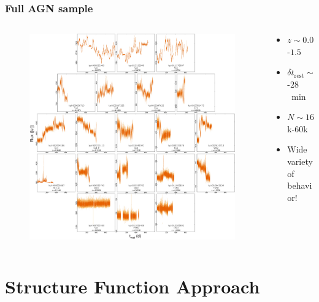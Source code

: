 \documentclass[hyperref={pdfpagelabels=false}]{beamer}
\begin{document}
\begin{frame}
\frametitle{Full AGN sample}
  \begin{columns}
    \centering
    \begin{column}{0.65\textwidth}
      \begin{figure}
        \includegraphics[scale=0.45]{images/AllLC.jpg}
      \end{figure}
    \end{column}
    \begin{column}{0.35\textwidth}
        \begin{itemize}
        \item $z \sim 0.02$-$1.5$
        \item $\delta t_{\mathrm{rest}} \sim 14$-$28$~min
        \item $N \sim 16$k-$60$k
        \item Wide variety of behavior!
        \end{itemize}
    \end{column}
  \end{columns}
\end{frame}

\section{Structure Function Approach}
\end{document}
